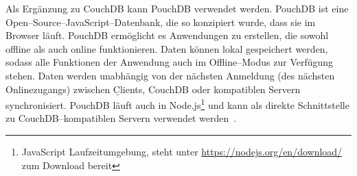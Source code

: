 %
%
Als Ergänzung zu CouchDB kann PouchDB verwendet werden. PouchDB ist eine Open--Source--JavaScript--Datenbank, die so konzipiert wurde, dass sie im Browser läuft. PouchDB ermöglicht es Anwendungen zu erstellen, die sowohl offline als auch online funktionieren. Daten können lokal gespeichert werden, sodass alle Funktionen der Anwendung auch im Offline--Modus zur Verfügung stehen.
Daten werden unabhängig von der nächsten Anmeldung (des nächsten Onlinezugangs) zwischen \b{Clients}, CouchDB oder kompatiblen Servern synchronisiert.
PouchDB läuft auch in Node.js\footnote{JavaScript Laufzeitumgebung, steht unter \url{https://nodejs.org/en/download/} zum Download bereit} und kann als direkte Schnittstelle zu CouchDB--kompatiblen Servern verwendet werden~\cite{pouch}.

